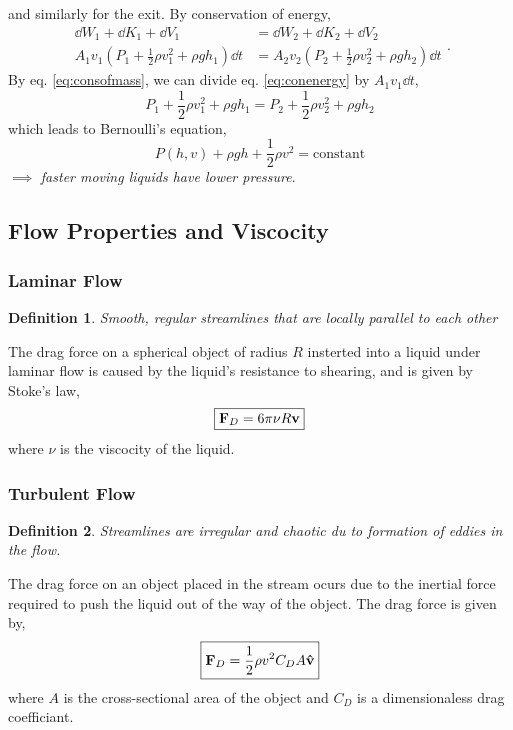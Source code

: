 \documentclass{book}
\newtheorem*{definition}{Definition}
\begin{document}
and similarly for the exit. By conservation of energy,
\begin{equation}
	\begin{split}
		\dd{W}_1 + \dd{K}_1 + \dd{V}_1 & = \dd{W}_2 + \dd{K}_2 + \dd{V}_2 \\
		A_1v_1\left(P_1 + \frac{1}{2}\rho v_1^2 + \rho g h_1\right)\dd{t} & = A_2v_2\left(P_2 + \frac{1}{2}\rho v_2^2 + \rho g h_2\right)\dd{t}
	\end{split}.\label{eq:conenergy}
\end{equation}
By eq. \eqref{eq:consofmass}, we can divide eq. \eqref{eq:conenergy} by $A_1v_1\dd{t}$,
\begin{equation}
	P_1 + \frac{1}{2}\rho v_1^2 + \rho g h_1 = P_2 + \frac{1}{2}\rho v_2^2 + \rho g h_2
\end{equation}
which leads to Bernoulli's equation,
\begin{equation}
	\boxed{P(h,v) + \rho g h + \frac{1}{2}\rho v^2 = \text{constant}}
\end{equation}
$\implies$ \textit{faster moving liquids have lower pressure}.
\subsection{Flow Properties and Viscocity}
\subsubsection{Laminar Flow}
\begin{definition}
	Smooth, regular streamlines that are locally parallel to each other
\end{definition}\noindent
The drag force on a spherical object of radius $R$ insterted into a liquid under laminar flow is caused by the liquid's resistance to shearing, and is given by Stoke's law,
\begin{equation}
	\boxed{\vb{F}_D = 6\pi \nu R\vb{v}}
\end{equation}
where $\nu$ is the viscocity of the liquid.
\subsubsection{Turbulent Flow}
\begin{definition}
	Streamlines are irregular and chaotic du to formation of eddies in the flow.
\end{definition}\noindent
The drag force on an object placed in the stream ocurs due to the inertial force required to push the liquid out of the way of the object. The drag force is given by,
\begin{equation}
	\boxed{\vb{F}_D = \frac{1}{2}\rho v^2 C_D A \vu{v}}
\end{equation}
where $A$ is the cross-sectional area of the object and $C_D$ is a dimensionaless drag coefficiant.
\end{document}
